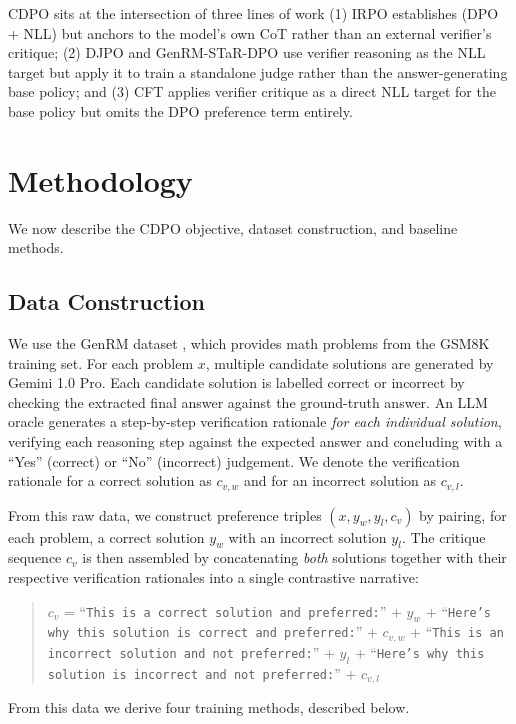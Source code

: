 \documentclass[11pt]{article}
\begin{document}
CDPO sits at the intersection of three lines of work (1) IRPO establishes (DPO + NLL) but anchors to the model's own CoT rather than an external verifier's critique; (2) DJPO and GenRM-STaR-DPO use verifier reasoning as the NLL target but apply it to train a standalone judge rather than the answer-generating base policy; and (3) CFT applies verifier critique as a direct NLL target for the base policy but omits the DPO preference term entirely.

\section{Methodology}

We now describe the CDPO objective, dataset construction, and baseline methods.

\subsection{Data Construction}
\label{sec:data}

We use the GenRM dataset \autocite{zhang2024generativeverifiersrewardmodeling}, which provides math problems from the GSM8K \autocite{cobbe2021training} training set. For each problem $x$, multiple candidate solutions are generated by Gemini 1.0 Pro. Each candidate solution is labelled correct or incorrect by checking the extracted final answer against the ground-truth answer. An LLM oracle generates a step-by-step verification rationale \textit{for each individual solution}, verifying each reasoning step against the expected answer and concluding with a ``Yes'' (correct) or ``No'' (incorrect) judgement. We denote the verification rationale for a correct solution as $c_{v,w}$ and for an incorrect solution as $c_{v,l}$.

From this raw data, we construct preference triples $(x, y_w, y_l, c_v)$ by pairing, for each problem, a correct solution $y_w$ with an incorrect solution $y_l$. The critique sequence $c_v$ is then assembled by concatenating \textit{both} solutions together with their respective verification rationales into a single contrastive narrative:
\begin{quote}
    \small
    $c_v$ = ``\texttt{This is a correct solution and preferred:}'' + $y_w$ + ``\texttt{Here's why this solution is correct and preferred:}'' + $c_{v,w}$ + ``\texttt{This is an incorrect solution and not preferred:}'' + $y_l$ + ``\texttt{Here's why this solution is incorrect and not preferred:}'' + $c_{v,l}$
\end{quote}
From this data we derive four training methods, described below.
\end{document}
